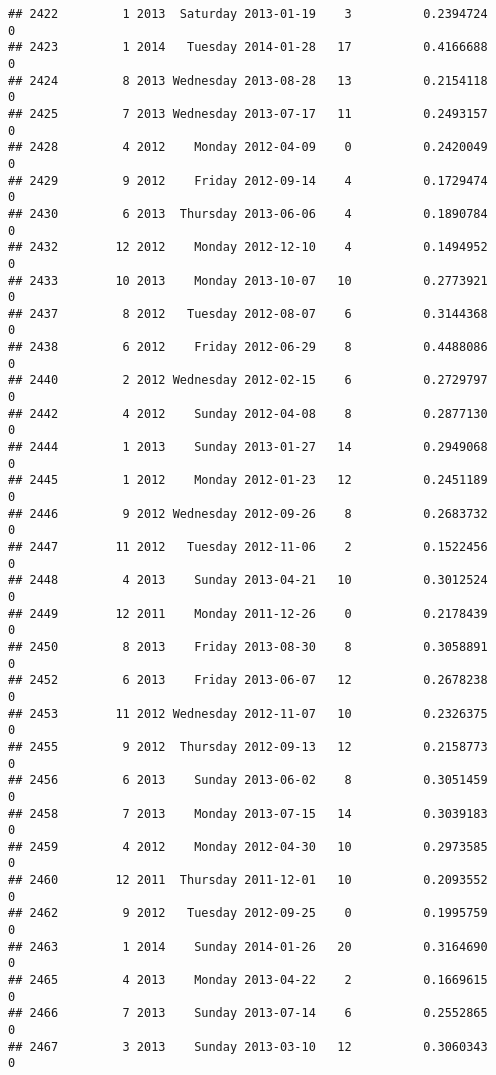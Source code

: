 \documentclass[
]{article}
\begin{document}
\begin{verbatim}
## 2422         1 2013  Saturday 2013-01-19    3          0.2394724             0
## 2423         1 2014   Tuesday 2014-01-28   17          0.4166688             0
## 2424         8 2013 Wednesday 2013-08-28   13          0.2154118             0
## 2425         7 2013 Wednesday 2013-07-17   11          0.2493157             0
## 2428         4 2012    Monday 2012-04-09    0          0.2420049             0
## 2429         9 2012    Friday 2012-09-14    4          0.1729474             0
## 2430         6 2013  Thursday 2013-06-06    4          0.1890784             0
## 2432        12 2012    Monday 2012-12-10    4          0.1494952             0
## 2433        10 2013    Monday 2013-10-07   10          0.2773921             0
## 2437         8 2012   Tuesday 2012-08-07    6          0.3144368             0
## 2438         6 2012    Friday 2012-06-29    8          0.4488086             0
## 2440         2 2012 Wednesday 2012-02-15    6          0.2729797             0
## 2442         4 2012    Sunday 2012-04-08    8          0.2877130             0
## 2444         1 2013    Sunday 2013-01-27   14          0.2949068             0
## 2445         1 2012    Monday 2012-01-23   12          0.2451189             0
## 2446         9 2012 Wednesday 2012-09-26    8          0.2683732             0
## 2447        11 2012   Tuesday 2012-11-06    2          0.1522456             0
## 2448         4 2013    Sunday 2013-04-21   10          0.3012524             0
## 2449        12 2011    Monday 2011-12-26    0          0.2178439             0
## 2450         8 2013    Friday 2013-08-30    8          0.3058891             0
## 2452         6 2013    Friday 2013-06-07   12          0.2678238             0
## 2453        11 2012 Wednesday 2012-11-07   10          0.2326375             0
## 2455         9 2012  Thursday 2012-09-13   12          0.2158773             0
## 2456         6 2013    Sunday 2013-06-02    8          0.3051459             0
## 2458         7 2013    Monday 2013-07-15   14          0.3039183             0
## 2459         4 2012    Monday 2012-04-30   10          0.2973585             0
## 2460        12 2011  Thursday 2011-12-01   10          0.2093552             0
## 2462         9 2012   Tuesday 2012-09-25    0          0.1995759             0
## 2463         1 2014    Sunday 2014-01-26   20          0.3164690             0
## 2465         4 2013    Monday 2013-04-22    2          0.1669615             0
## 2466         7 2013    Sunday 2013-07-14    6          0.2552865             0
## 2467         3 2013    Sunday 2013-03-10   12          0.3060343             0

\end{verbatim}
\end{document}
